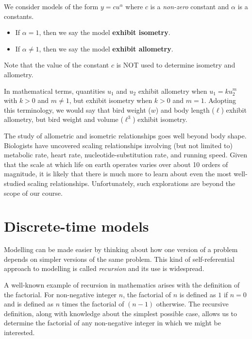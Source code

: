 \documentclass[../book.tex]{subfiles}
\begin{document}
\begin{definition} \label{def:isometry-allometry}
We consider models of the form \(y = c u^{\alpha}\) where \(c\) is a \emph{non-zero} constant and \(\alpha\) is a constants.

\begin{itemize}
  \item If \(\alpha = 1\), then we say the model \textbf{exhibit isometry}.
  \item If \(\alpha \ne 1\), then we say the model \textbf{exhibit allometry}.
\end{itemize}

Note that the value of the constant \(c\) is NOT used to determine isometry and allometry.
\end{definition}

In mathematical terms, quantities \(u_1\) and \(u_2\) exhibit allometry when \(u_1 = k u_2^m\) with \(k>0\) and \(m\neq 1\), but exhibit isometry when \(k>0\) and \(m=1\). Adopting this terminology, we would say that bird weight (\(w\)) and body length (\(\ell\)) exhibit allometry, but bird weight and volume (\(\ell^3\)) exhibit isometry.

The study of allometric and isometric relationships goes well beyond body shape. Biologists have uncovered scaling relationships involving (but not limited to) metabolic rate, heart rate, nucleotide-substitution rate, and running speed. Given that the scale at which life on earth operates varies over about 10 orders of magnitude, it is likely that there is much more to learn about even the most well-studied scaling relationships. Unfortunately, such explorations are beyond the scope of our course.

\section{Discrete-time models}

Modelling can be made easier by thinking about how one version of a problem depends on simpler versions of the same problem. This kind of self-referential approach to modelling is called \emph{recursion} and its use is widespread.

A well-known example of recursion in mathematics arises with the definition of the factorial. For non-negative integer \(n\), the factorial of \(n\) is defined as \(1\) if \(n=0\) and is defined as \(n\) times the factorial of \((n-1)\) otherwise. The recursive definition, along with knowledge about the simplest possible case, allows us to determine the factorial of any non-negative integer in which we might be interested.
\end{document}
